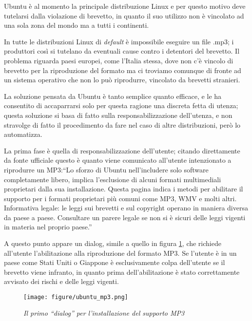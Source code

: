 Ubuntu è al momento la principale distribuzione Linux e per questo motivo deve tutelarsi dalla violazione di brevetto, in quanto il suo utilizzo non è vincolato ad una sola zona del mondo ma a tutti i continenti.

In tutte le distribuzioni Linux di \textit{default} è impossibile eseguire un file .mp3; i produttori così si tutelano da eventuali cause contro i detentori del brevetto. Il problema riguarda paesi europei, come l'Italia stessa, dove non c'è vincolo di brevetto per la riproduzione del formato ma ci troviamo comunque di fronte ad un sistema operativo che non lo può riprodurre, vincolato da brevetti stranieri. 

La soluzione pensata da Ubuntu è tanto semplice quanto efficace, e le ha consentito di accaparrarsi solo per questa ragione una discreta fetta di utenza; questa soluzione si basa di fatto sulla responsabilizzazione dell'utenza, e non stravolge di fatto il procedimento da fare nel caso di altre distribuzioni, però lo automatizza.

La prima fase è quella di responsabilizzazione dell'utente; citando direttamente da fonte ufficiale questo è quanto viene comunicato all'utente intenzionato a riprodurre un MP3:``Lo sforzo di Ubuntu nell'includere solo software completamente libero, implica l'esclusione di alcuni formati multimediali proprietari dalla sua installazione. Questa pagina indica i metodi per abilitare il supporto per i formati proprietari più comuni come MP3, WMV e molti altri. Informativa legale: le leggi sui brevetti e sul copyright operano in maniera diversa da paese a paese. Consultare un parere legale se non si è sicuri delle leggi vigenti in materia nel proprio paese.''

A questo punto appare un dialog, simile a quello in figura \ref{dialog}, che richiede all'utente l'abilitazione alla riproduzione del formato MP3. Se l'utente è in un paese come Stati Uniti o Giappone è esclusivamente colpa dell'utente se il brevetto viene infranto, in quanto prima dell'abilitazione è stato correttamente avvisato dei rischi e delle leggi vigenti.

\begin{figure}[htb]
	\begin{center}
		\texttt{[image: figure/ubuntu\_mp3.png]}\label{dialog}
	\end{center}
	\caption{\textit{Il primo ``dialog'' per l'installazione del supporto MP3}}
\end{figure}

